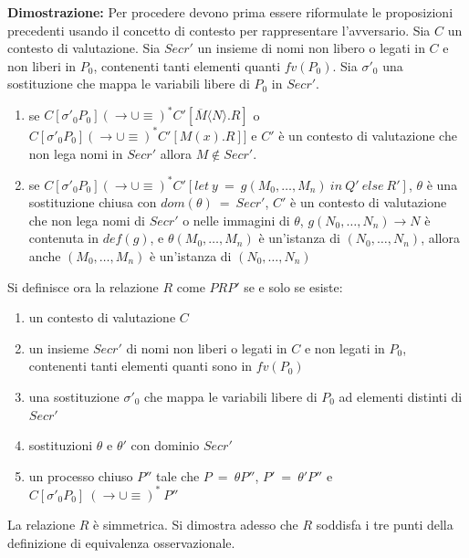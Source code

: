 \documentclass[12pt]{report}
\begin{document}
\textbf{Dimostrazione:} Per procedere devono prima essere riformulate le proposizioni precedenti usando il concetto di contesto per rappresentare l'avversario. Sia $C$ un contesto di valutazione. Sia $Secr'$ un insieme di nomi non libero o legati in $C$ e non liberi in $P_0$, contenenti tanti elementi quanti $fv(P_0)$. Sia $\sigma'_0$ una sostituzione che mappa le variabili libere di $P_0$ in $Secr'$.
\begin{enumerate}
    \item se $C[\sigma'_0 P_0] (\rightarrow \cup \equiv)^* C'[\overline{M} \langle N \rangle . R]$ o $C[\sigma'_0 P_0] (\rightarrow \cup \equiv)^* C'[M(x).R]]$ e $C'$ è un contesto di valutazione che non lega nomi in $Secr'$ allora $M \notin Secr'$.
    \item se $C[\sigma'_0 P_0] (\rightarrow \cup \equiv)^* C'[let\ y\ =\ g(M_0,\dots,M_n)\ in\ Q'\ else\ R']$, $\theta$ è una sostituzione chiusa con $dom(\theta)\ =\ Secr'$, $C'$ è un contesto di valutazione che non lega nomi di $Secr'$ o nelle immagini di $\theta$, $g(N_0,\dots,N_n) \rightarrow N$ è contenuta in $def(g)$, e $\theta (M_0,\dots,M_n)$ è un'istanza di $(N_0,\dots,N_n)$, allora anche $(M_0,\dots,M_n)$ è un'istanza di $(N_0,\dots,N_n)$ 
\end{enumerate}
Si definisce ora la relazione $R$ come $PRP'$ se e solo se esiste:\\
\begin{enumerate}
    \item un contesto di valutazione $C$
    \item un insieme $Secr'$ di nomi non liberi o legati in $C$ e non legati in $P_0$, contenenti tanti elementi quanti sono in $fv(P_0)$
    \item una sostituzione $\sigma'_0$ che mappa le variabili libere di $P_0$ ad elementi distinti di $Secr'$
    \item sostituzioni $\theta$ e $\theta'$ con dominio $Secr'$
    \item un processo chiuso $P''$ tale che $P\ =\ \theta P''$, $P'\ =\ \theta'P''$ e\\ $C[\sigma'_0 P_0]\ (\rightarrow \cup \equiv)^*\ P''$  
\end{enumerate}
La relazione $R$ è simmetrica. Si dimostra adesso che $R$ soddisfa i tre punti della definizione di equivalenza osservazionale.\\
\end{document}
